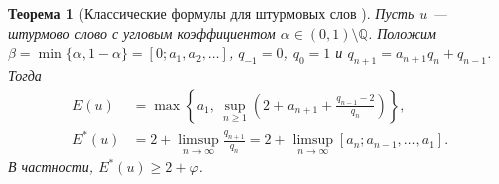 \documentclass[12pt,a4paper]{article}
\newtheorem{theorem}{Теорема}[section]
\begin{document}
\begin{theorem}[Классические формулы для штурмовых слов
{\cite{DamanikLenz2002,Peltomaki2015,AdamczewskiAllouche2007}}]\label{thmconsn1}
Пусть $u$ --- штурмово слово с угловым коэффициентом
$\alpha\in(0,1)\setminus\mathbb Q$.
Положим $\beta=\min\{\alpha,1-\alpha\}=[0;a_1,a_2,\ldots]$,
$q_{-1}=0$, $q_0=1$ и
$q_{n+1}=a_{n+1}q_n+q_{n-1}$.
Тогда
\begin{align}
 E(u)&=\max\left\{a_1,\
       \sup_{n\ge1}\left(2+a_{n+1}+\frac{q_{n-1}-2}{q_n}\right)\right\},
       \label{eq:correct-index}\\
 E^*(u)&=2+\limsup_{n\to\infty}\frac{q_{n+1}}{q_n}
       =2+\limsup_{n\to\infty}[a_n;a_{n-1},\ldots,a_1].
       \label{eq:correct-asymptotic-index}
\end{align}
В частности, $E^*(u)\ge2+\varphi$.
\end{theorem}
\end{document}
